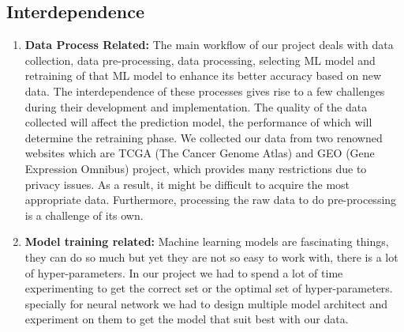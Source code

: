 \subsection{Interdependence}
\begin{enumerate}
    

  \item \textbf{Data Process Related:} The main workflow of our project deals with data collection, data pre-processing, data processing, selecting ML model and retraining of that ML model to enhance its better accuracy based on new data. The interdependence of these processes gives rise to a few challenges during their development and implementation. The quality of the data collected will affect the prediction model, the performance of which will determine the retraining phase. We collected our data from two renowned websites which are TCGA (The Cancer Genome Atlas) and GEO (Gene Expression Omnibus) project, which provides many restrictions due to privacy issues. As a result, it might be difficult to acquire the most appropriate data. Furthermore, processing the raw data to do pre-processing is a challenge of its own. 
  \item \textbf{Model training related:} Machine learning models are fascinating things, they can do so much but yet they are not so easy to work with, there is a lot of hyper-parameters. In our project we had to spend a lot of time experimenting to get the correct set or the optimal set of hyper-parameters. specially for neural network we had to design multiple model architect and experiment on them to get the model that suit best with our data.  
\end{enumerate}

